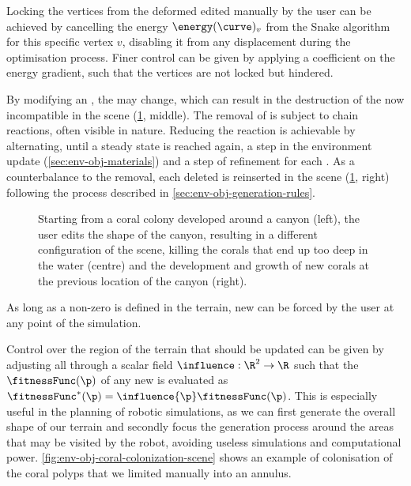 Locking the vertices from the deformed  edited manually by the user can be achieved by cancelling the energy $\energy(\curve)_v$ from the Snake algorithm for this specific vertex $v$, disabling it from any displacement during the optimisation process. Finer control can be given by applying a coefficient on the energy gradient, such that the vertices are not locked but hindered.

By modifying an , the  may change, which can result in the destruction of the now incompatible  in the scene (\cref{fig:env-obj-user-interaction}, middle). The removal of  is subject to chain reactions, often visible in nature. Reducing the reaction is achievable by alternating, until a steady state is reached again, a step in the environment update (\cref{sec:env-obj-materials}) and a step of  refinement for each . As a counterbalance to the removal, each deleted  is reinserted in the scene (\cref{fig:env-obj-user-interaction}, right) following the process described in \cref{sec:env-obj-generation-rules}.

\begin{figure}
    \caption{Starting from a coral colony developed around a canyon (left), the user edits the shape of the canyon, resulting in a different configuration of the scene, killing the corals that end up too deep in the water (centre) and the development and growth of new corals at the previous location of the canyon (right).}
    \label{fig:env-obj-user-interaction}
\end{figure}

As long as a non-zero  is defined in the terrain, new  can be forced by the user at any point of the simulation.

Control over the region of the terrain that should be updated can be given by adjusting all  through a scalar field $\influence: \R^2 \to \R $ such that the  $\fitnessFunc(\p)$ of any new  is evaluated as $\fitnessFunc^*(\p) = \influence{\p} \fitnessFunc(\p)$. This is especially useful in the planning of robotic simulations, as we can first generate the overall shape of our terrain and secondly focus the generation process around the areas that may be visited by the robot, avoiding useless simulations and computational power.
\cref{fig:env-obj-coral-colonization-scene} shows an example of colonisation of the coral polyps that we limited manually into an annulus.

